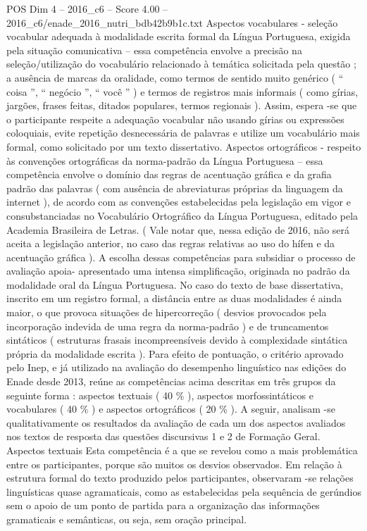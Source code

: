 \begin{textsample}{POS Dim 4 – 2016\_c6 – Score 4.00 – 2016\_c6/enade\_2016\_nutri\_bdb42b9b1c.txt}
Aspectos vocabulares - seleção vocabular adequada à modalidade escrita formal da Língua Portuguesa, exigida pela situação comunicativa – essa competência envolve a precisão na seleção/utilização do vocabulário relacionado à temática solicitada pela questão ; a ausência de marcas da oralidade, como termos de sentido muito genérico ( “ coisa ”, “ negócio ”, “ você ” ) e termos de registros mais informais ( como gírias, jargões, frases feitas, ditados populares, termos regionais ).
Assim, espera -se que o participante respeite a adequação vocabular não usando gírias ou expressões coloquiais, evite repetição desnecessária de palavras e utilize um vocabulário mais formal, como solicitado por um texto dissertativo.
Aspectos ortográficos - respeito às convenções ortográficas da norma-padrão da Língua Portuguesa – essa competência envolve o domínio das regras de acentuação gráfica e da grafia padrão das palavras ( com ausência de abreviaturas próprias da linguagem da internet ), de acordo com as convenções estabelecidas pela legislação em vigor e consubstanciadas no Vocabulário Ortográfico da Língua Portuguesa, editado pela Academia Brasileira de Letras. ( Vale notar que, nessa edição de 2016, não será aceita a legislação anterior, no caso das regras relativas ao uso do hífen e da acentuação gráfica ).
A escolha dessas competências para subsidiar o processo de avaliação apoia- apresentado uma intensa simplificação, originada no padrão da modalidade oral da Língua Portuguesa.
No caso do texto de base dissertativa, inscrito em um registro formal, a distância entre as duas modalidades é ainda maior, o que provoca situações de hipercorreção ( desvios provocados pela incorporação indevida de uma regra da norma-padrão ) e de truncamentos sintáticos ( estruturas frasais incompreensíveis devido à complexidade sintática própria da modalidade escrita ).
Para efeito de pontuação, o critério aprovado pelo Inep, e já utilizado na avaliação do desempenho linguístico nas edições do Enade desde 2013, reúne as competências acima descritas em três grupos da seguinte forma : aspectos textuais ( 40 \% ), aspectos morfossintáticos e vocabulares ( 40 \% ) e aspectos ortográficos ( 20 \% ).
A seguir, analisam -se qualitativamente os resultados da avaliação de cada um dos aspectos avaliados nos textos de resposta das questões discursivas 1 e 2 de Formação Geral.
Aspectos textuais Esta competência é a que se revelou como a mais problemática entre os participantes, porque são muitos os desvios observados.
Em relação à estrutura formal do texto produzido pelos participantes, observaram -se relações linguísticas quase agramaticais, como as estabelecidas pela sequência de gerúndios sem o apoio de um ponto de partida para a organização das informações gramaticais e semânticas, ou seja, sem oração principal.

\end{textsample}
